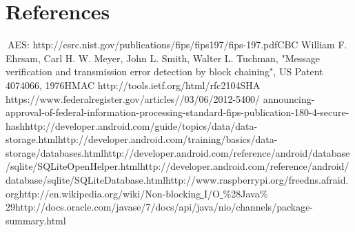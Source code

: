 \documentclass{report}
\begin{document}
\section{References}
\vspace{-3mm}
$\:$\newline
[1] AES: http://csrc.nist.gov/publications/fips/fips197/fips-197.pdf\newline
[2] CBC William F. Ehrsam, Carl H. W. Meyer, John L. Smith, Walter L. Tuchman,
"Message verification and transmission error detection by block chaining", US Patent 4074066, 1976\newline
[3] HMAC http://tools.ietf.org/html/rfc2104\newline
[4] SHA https://www.federalregister.gov/articles//03/06/2012-5400/ announcing-approval-of-federal-information-processing-standard-fips-publication-180-4-secure-hash\newline
[5] http://developer.android.com/guide/topics/data/\newline data-storage.html\newline
[6] http://developer.android.com/training/basics/data-storage/\newline databases.html\newline
[7] http://developer.android.com/reference/android/database/\newline sqlite/SQLiteOpenHelper.html\newline
[8] http://developer.android.com/reference/android/database/\newline sqlite/SQLiteDatabase.html\newline
[9] http://www.raspberrypi.org/\newline
[10] freedns.afraid.org\newline
[11] http://en.wikipedia.org/wiki/Non-blocking$\_$I/O$\_$$\%$28Java$\%$29\newline
[12] http://docs.oracle.com/javase/7/docs/api/java/nio/channels/\newline package-summary.html\newline





\end{document}
